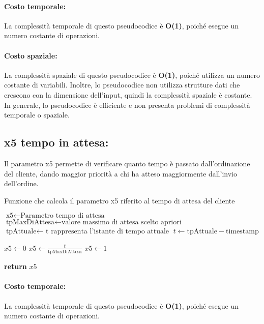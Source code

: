 \paragraph{Costo temporale:}
La complessità temporale di questo pseudocodice è \textbf{O(1)}, poiché esegue un numero costante di operazioni.

\paragraph{Costo spaziale:}
La complessità spaziale di questo pseudocodice è \textbf{O(1)}, poiché utilizza un numero costante di variabili. Inoltre, lo pseudocodice non utilizza strutture dati che crescono con la dimensione dell'input, quindi la complessità spaziale è costante. In generale, lo pseudocodice è efficiente e non presenta problemi di complessità temporale o spaziale.

\subsection{x5 tempo in attesa:}
Il  parametro x5 permette di verificare quanto tempo è passato dall'ordinazione del cliente, dando maggior priorità a chi ha atteso maggiormente dall'invio dell'ordine.
\begin{algorithm}[h]
	\begin{algorithmic}[h!]
		\caption{Funzione che calcola il parametro x5 riferito al tempo di attesa del cliente}
		\medskip
		\State $\text{x5} \gets \text{Parametro tempo di attesa}$
		\State $\text{tpMaxDiAttesa} \gets \text{valore massimo di attesa scelto apriori}$
		\State $\text{tpAttuale} \gets \text{ t rappresenta l'istante di tempo attuale}$
		\State $t \gets \text{tpAttuale} - \text{timestamp}$  
		\medskip
		
		\State $x5 \gets 0$  
		\State $x5 \gets \frac{t}{\text{tpMaxDiAttesa}}$
		\Else
		\State $x5 \gets 1$ 
		\EndIf
		
		\State \textbf{return} $x5$
		\EndFunction
	\end{algorithmic}
\end{algorithm}

\paragraph{Costo temporale:}
La complessità temporale di questo pseudocodice è \textbf{O(1)}, poiché esegue un numero costante di operazioni.

